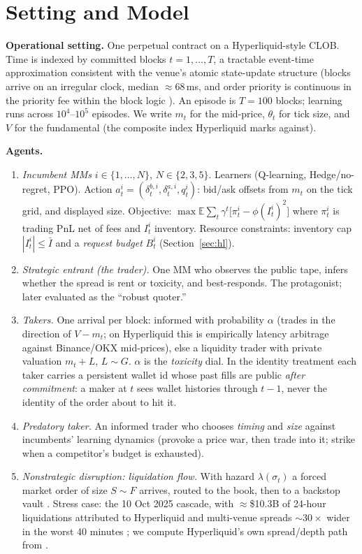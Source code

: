 \documentclass[11pt]{article}
\newcommand{\E}{\mathbb{E}}
\begin{document}
\section{Setting and Model}\label{sec:model}
\textbf{Operational setting.} One perpetual contract on a Hyperliquid-style CLOB. Time is indexed by committed blocks $t=1,\dots,T$, a tractable event-time approximation consistent with the venue's atomic state-update structure (blocks arrive on an irregular clock, median $\approx 68$\,ms, and order priority is continuous in the priority fee within the block logic \cite{hldocs}). An episode is $T=100$ blocks; learning runs across $10^4$--$10^5$ episodes. We write $m_t$ for the mid-price, $\theta_t$ for tick size, and $V$ for the fundamental (the composite index Hyperliquid marks against).

\textbf{Agents.}
\begin{enumerate}[label=(\alph*)]
\item \emph{Incumbent MMs} $i\in\{1,\dots,N\}$, $N\in\{2,3,5\}$. Learners (Q-learning, Hedge/no-regret, PPO). Action $a^i_t=(\delta^{b,i}_t,\delta^{a,i}_t,q^i_t)$: bid/ask offsets from $m_t$ on the tick grid, and displayed size. Objective: $\max \E\!\sum_t \gamma^t\big[\pi^i_t-\phi (I^i_t)^2\big]$ where $\pi^i_t$ is trading PnL net of fees and $I^i_t$ inventory. Resource constraints: inventory cap $|I^i_t|\le \bar I$ and a \emph{request budget} $B^i_t$ (Section~\ref{sec:hl}).
\item \emph{Strategic entrant (the trader).} One MM who observes the public tape, infers whether the spread is rent or toxicity, and best-responds. The protagonist; later evaluated as the ``robust quoter.''
\item \emph{Takers.} One arrival per block: informed with probability $\alpha$ (trades in the direction of $V-m_t$; on Hyperliquid this is empirically latency arbitrage against Binance/OKX mid-prices), else a liquidity trader with private valuation $m_t+L$, $L\sim G$. $\alpha$ is the \emph{toxicity} dial. In the identity treatment each taker carries a persistent wallet id whose past fills are public \emph{after commitment}: a maker at $t$ sees wallet histories through $t-1$, never the identity of the order about to hit it.
\item \emph{Predatory taker.} An informed trader who chooses \emph{timing} and \emph{size} against incumbents' learning dynamics (provoke a price war, then trade into it; strike when a competitor's budget is exhausted).
\item \emph{Nonstrategic disruption: liquidation flow.} With hazard $\lambda(\sigma_t)$ a forced market order of size $S\sim F$ arrives, routed to the book, then to a backstop vault \cite{hldocs}. Stress case: the 10 Oct 2025 cascade, with $\approx$\$10.3B of 24-hour liquidations attributed to Hyperliquid and multi-venue spreads $\sim30\times$ wider in the worst 40 minutes \cite{oct10}; we compute Hyperliquid's own spread/depth path from \cite{albers}.
\end{enumerate}
\end{document}
